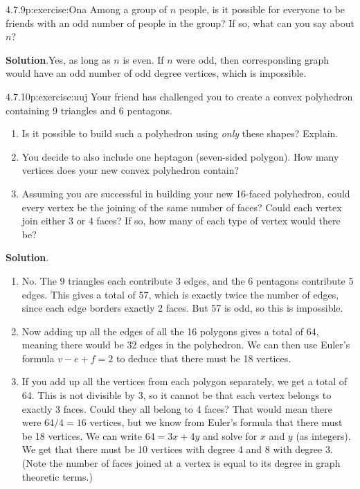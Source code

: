 \documentclass[twoside,11pt,]{book}
\newcommand{\blocktitlefont}{\relax}
\numberwithin{equation}{chapter}
\begin{document}
\begin{divisionsolution}{4.7.9}{}{p:exercise:Ona}%
Among a group of \(n\) people, is it possible for everyone to be friends with an odd number of people in the group? If so, what can you say about \(n\)?%
\par\smallskip%
\noindent\textbf{\blocktitlefont Solution}.\quad{}Yes, as long as \(n\) is even. If \(n\) were odd, then corresponding graph would have an odd number of odd degree vertices, which is impossible.%
\end{divisionsolution}%
\begin{divisionsolution}{4.7.10}{}{p:exercise:uuj}%
Your friend has challenged you to create a convex polyhedron containing 9 triangles and 6 pentagons.%
\begin{enumerate}[label=(\alph*)]
\item{}Is it possible to build such a polyhedron using \emph{only} these shapes? Explain.%
\item{}You decide to also include one heptagon (seven-sided polygon). How many vertices does your new convex polyhedron contain?%
\item{}Assuming you are successful in building your new 16-faced polyhedron, could every vertex be the joining of the same number of faces? Could each vertex join either 3 or 4 faces? If so, how many of each type of vertex would there be?%
\end{enumerate}
%
\par\smallskip%
\noindent\textbf{\blocktitlefont Solution}.\quad{}%
\begin{enumerate}[label=(\alph*)]
\item{}No. The 9 triangles each contribute 3 edges, and the 6 pentagons contribute 5 edges. This gives a total of 57, which is exactly twice the number of edges, since each edge borders exactly 2 faces. But 57 is odd, so this is impossible.%
\item{}Now adding up all the edges of all the 16 polygons gives a total of 64, meaning there would be 32 edges in the polyhedron. We can then use Euler's formula \(v - e + f = 2\) to deduce that there must be 18 vertices.%
\item{}If you add up all the vertices from each polygon separately, we get a total of 64. This is not divisible by 3, so it cannot be that each vertex belongs to exactly 3 faces. Could they all belong to 4 faces? That would mean there were \(64/4 = 16\) vertices, but we know from Euler's formula that there must be 18 vertices. We can write \(64 = 3x + 4y\) and solve for \(x\) and \(y\) (as integers). We get that there must be 10 vertices with degree 4 and 8 with degree 3. (Note the number of faces joined at a vertex is equal to its degree in graph theoretic terms.)%
\end{enumerate}
%
\end{divisionsolution}%
\end{document}
